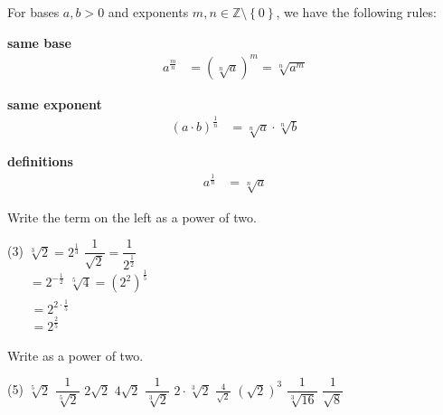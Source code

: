 \begin{tcolorbox}
	For bases $a,b>0$ and exponents $m,n\in\mathbb Z\setminus\left\{0\right\}$, we have the following rules:
	\begin{multicols}{3}
		\centering
		\textbf{same base}\\
		\begin{align*}
			a^{\frac{m}{n}}&=\left(\sqrt[n]{a}\right)^m
			=\sqrt[n]{a^m}
		\end{align*}
		\vfill
		\columnbreak
		
		\textbf{same exponent}\\
		\begin{align*}
			\left(a\cdot b\right)^{\frac{1}{n}}&=\sqrt[n]{a}\cdot\sqrt[n]{b}%
		\end{align*}
		\vfill
		\columnbreak
		
		\textbf{definitions}\\
		\begin{align*}
			a^{\frac{1}{n}}&=\sqrt[n]{a}%
		\end{align*}
		\vfill
	\end{multicols}
\end{tcolorbox}
\begin{example}
	Write the term on the left as a power of two.
	\begin{tasks}(3)
		\task $\sqrt[3]{2}=2^{\frac{1}{3}}$
		\task $\dfrac{1}{\sqrt{2}}=\dfrac{1}{2^{\frac{1}{2}}}$  \\[4pt]
		$\phantom{\dfrac{1}{\sqrt{2}}}=2^{-\frac{1}{2}}$
		\task $\sqrt[5]{4}=\left(2^2\right)^{\frac{1}{5}}$  \\[4pt]
		$\phantom{\sqrt[5]{4}}=2^{2\cdot\frac{1}{5}}$ \\[4pt]
		$\phantom{\sqrt[5]{4}}=2^{\frac{2}{5}}$
	\end{tasks}
\end{example}
\begin{exercise}
	Write as a power of two.
	\begin{tasks}(5)
		\task $\sqrt[5]{2}$
		\task $\dfrac{1}{\sqrt[5]{2}}$
		\task $2\sqrt{2}$
		\task $4\sqrt{2}$
		\task $\dfrac{1}{\sqrt[3]{2}}$
		\task $2\cdot\sqrt[3]{2}$
		\task $\frac{4}{\sqrt{2}}$
		\task $\left(\sqrt{2}\right)^3$
		\task $\dfrac{1}{\sqrt[3]{16}}$
		\task $\dfrac{1}{\sqrt{8}}$
	\end{tasks}
\end{exercise}
